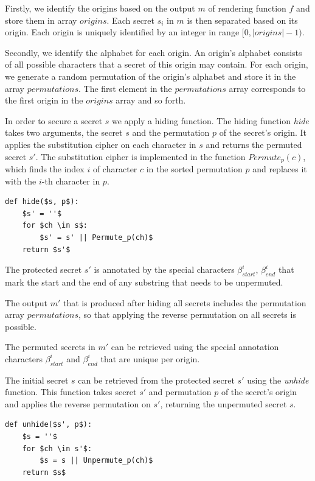 \documentclass[conference, letterpaper, 10pt]{IEEEtran}
\begin{document}
Firstly, we identify the origins based on the output $m$ of rendering function
$f$ and store them in array $origins$. Each secret $s_i$ in $m$ is then
separated based on its origin. Each origin is uniquely identified by an integer
in range $[0, |origins|-1)$.

Secondly, we identify the alphabet for each origin. An origin's alphabet
consists of all possible characters that a secret of this origin may contain.
For each origin, we generate a random permutation of the origin's alphabet and
store it in the array $permutations$. The first element in the $permutations$
array corresponds to the first origin in the $origins$ array and so forth.

In order to secure a secret $s$ we apply a hiding function. The hiding function
\textit{hide} takes two arguments, the secret $s$ and the permutation $p$ of the
secret's origin. It applies the substitution cipher on each character in $s$ and
returns the permuted secret $s'$. The substitution cipher is implemented in the
function $Permute_p(c)$, which finds the index $i$ of character $c$ in the sorted
permutation $p$ and replaces it with the $i$-th character in $p$.

\begin{lstlisting}[texcl,mathescape,basicstyle=\small]
def hide($s, p$):
    $s' = ''$
    for $ch \in s$:
        $s' = s' || Permute_p(ch)$
    return $s'$
\end{lstlisting}

The protected secret $s'$ is annotated by the special characters
$\beta_{start}^i$, $\beta_{end}^i$ that mark the start and the end of any
substring that needs to be unpermuted.

The output $m'$ that is produced after hiding all secrets includes the
permutation array $permutations$, so that applying the reverse permutation on
all secrets is possible.

The permuted secrets in $m'$ can be retrieved using the special annotation
characters $\beta_{start}^i$ and $\beta_{end}^i$ that are unique per origin.

The initial secret $s$ can be retrieved from the protected secret $s'$
using the \textit{unhide} function. This function takes secret $s'$ and
permutation $p$ of the secret's origin and applies the reverse permutation on
$s'$, returning the unpermuted secret $s$.

\begin{lstlisting}[texcl,mathescape,basicstyle=\small]
def unhide($s', p$):
    $s = ''$
    for $ch \in s'$:
        $s = s || Unpermute_p(ch)$
    return $s$
\end{lstlisting}
\end{document}
